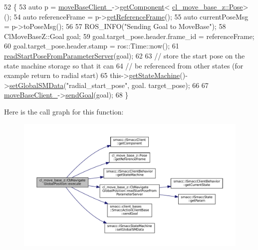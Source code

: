 \begin{DoxyCode}
52     \{
53         \textcolor{keyword}{auto} p = \hyperlink{classcl__move__base__z_1_1CbMoveBaseClientBehaviorBase_ab2ef219464cfac8659b4a87c8d0db6d5}{moveBaseClient\_}->\hyperlink{classsmacc_1_1ISmaccClient_adef78db601749ca63c19e74a27cb88cc}{getComponent}<
      \hyperlink{classcl__move__base__z_1_1Pose}{cl\_move\_base\_z::Pose}>();
54         \textcolor{keyword}{auto} referenceFrame = p->\hyperlink{classcl__move__base__z_1_1Pose_af8c2dc151e74aa8da6b283d1c8563051}{getReferenceFrame}();
55         \textcolor{keyword}{auto} currentPoseMsg = p->toPoseMsg();
56 
57         ROS\_INFO(\textcolor{stringliteral}{"Sending Goal to MoveBase"});
58         ClMoveBaseZ::Goal goal;
59         goal.target\_pose.header.frame\_id = referenceFrame;
60         goal.target\_pose.header.stamp = ros::Time::now();
61         \hyperlink{classcl__move__base__z_1_1CbNavigateGlobalPosition_a868b25f238e3781c9a2e44b4e1502fcc}{readStartPoseFromParameterServer}(goal);
62 
63         \textcolor{comment}{// store the start pose on the state machine storage so that it can}
64         \textcolor{comment}{// be referenced from other states (for example return to radial start)}
65         this->\hyperlink{classsmacc_1_1ISmaccClientBehavior_a9d55a85bf0a920033805a3c050de2019}{getStateMachine}()->\hyperlink{classsmacc_1_1ISmaccStateMachine_a8588f9e580fbb95b53e2bd2ca3ff1f98}{setGlobalSMData}(\textcolor{stringliteral}{"radial\_start\_pose"}, goal.
      target\_pose);
66 
67         \hyperlink{classcl__move__base__z_1_1CbMoveBaseClientBehaviorBase_ab2ef219464cfac8659b4a87c8d0db6d5}{moveBaseClient\_}->\hyperlink{classsmacc_1_1client__bases_1_1SmaccActionClientBase_a9c47a5094ac8afb01680307fe5eca922}{sendGoal}(goal);
68     \}
\end{DoxyCode}
Here is the call graph for this function\+:
\nopagebreak
\begin{figure}[H]
\begin{center}
\leavevmode
\includegraphics[width=350pt]{classcl__move__base__z_1_1CbNavigateGlobalPosition_a0b8525ea9e4388b27cb1f9b1e06a3b63_cgraph}
\end{center}
\end{figure}
